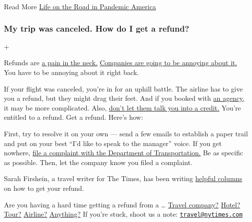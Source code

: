  Read More
\href{https://www.nytimes.com/2020/06/14/business/coronavirus-road-trip.html}{Life
on the Road in Pandemic America}

\hypertarget{my-trip-was-canceled-how-do-i-get-a-refund}{%
\subsubsection{My trip was canceled. How do I get a
refund?}\label{my-trip-was-canceled-how-do-i-get-a-refund}}

+

Refunds are
\href{https://www.nytimes.com/2020/04/18/your-money/coronavirus-refunds.html}{a
pain in the neck.}
\href{https://www.nytimes.com/2020/06/12/travel/virus-airlines-private-arbitration.html}{Companies
are going to be annoying about it.} You have to be annoying about it
right back.

If your flight was canceled, you're in for an uphill battle. The airline
has to give you a refund, but they might drag their feet. And if you
booked with
\href{https://www.nytimes.com/2020/04/03/travel/coronavirus-refund-travel-ota.html}{an
agency,} it may be more complicated. Also,
\href{https://www.nytimes.com/2020/05/12/travel/refunds-or-credits-travelers-and-businesses-face-off.html}{don't
let them talk you into a credit.} You're entitled to a refund. Get a
refund. Here's how:

First, try to resolve it on your own --- send a few emails to establish
a paper trail and put on your best ``I'd like to speak to the manager''
voice. If you get nowhere,
\href{https://airconsumer.dot.gov/escomplaint/ConsumerForm.cfm}{file a
complaint with the Department of Transportation.} Be as specific as
possible. Then, let the company know you filed a complaint.

Sarah Firshein, a travel writer for The Times, has been writing
\href{https://www.nytimes.com/2019/09/15/reader-center/travel-sarah-firshein-tripped-up-columnist.html}{helpful
columns} on how to get your refund.

Are you having a hard time getting a refund from a \ldots{}
\href{https://www.nytimes.com/2020/05/25/travel/coronavirus-refunds-overseas-adventure-travel.html}{Travel
company?}
\href{https://www.nytimes.com/2020/07/07/travel/virus-refunds-hotel-franchises.html}{Hotel?}
\href{https://www.nytimes.com/2020/04/11/travel/coronavirus-travel-trip-refunds.html}{Tour?}
\href{https://www.nytimes.com/2020/05/01/travel/trip-refund-airlines.html}{Airline?}
\href{https://www.nytimes.com/2020/06/18/travel/travel-refunds-airlines.html}{Anything?}
If you're stuck, shoot us a note:
\href{mailto:travel@nytimes.com}{\nolinkurl{travel@nytimes.com}}

